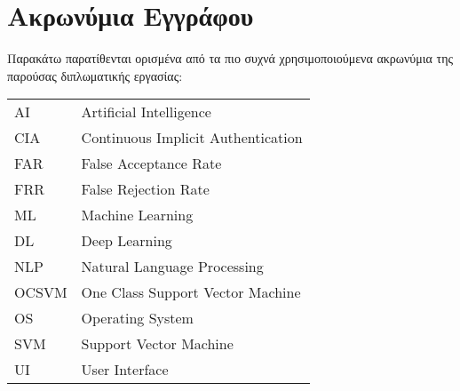 \chapter*{Ακρωνύμια Εγγράφου}
\label{append:acronyms}
{}

Παρακάτω παρατίθενται ορισμένα από τα πιο συχνά χρησιμοποιούμενα ακρωνύμια της
παρούσας διπλωματικής εργασίας:

\begin{table}[htpb]
  \centering
  \begin{tabular}{l@{$\;\;\longrightarrow\;\;$}l}
    AI & Artificial Intelligence \\
    CIA & Continuous Implicit Authentication \\
    FAR & False Acceptance Rate \\
    FRR & False Rejection Rate \\
    ML & Machine Learning \\
    DL & Deep Learning \\
    NLP & Natural Language Processing \\
    OCSVM & One Class Support Vector Machine \\
    OS & Operating System \\
    SVM & Support Vector Machine \\
    UI & User Interface \\
  \end{tabular}
\end{table}
